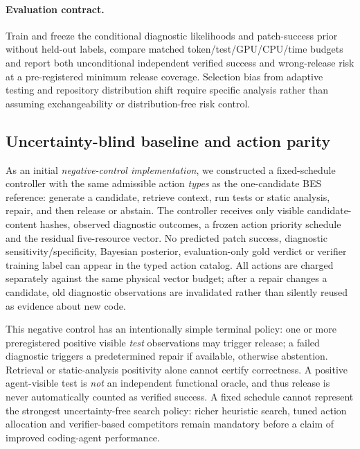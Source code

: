 \documentclass[pdflatex,sn-basic]{sn-jnl}
\begin{document}
\paragraph{Evaluation contract.}
Train and freeze the conditional diagnostic likelihoods and
patch-success prior without held-out labels, compare matched
token/test/GPU/CPU/time budgets and report both unconditional
independent verified success and wrong-release risk at a
pre-registered minimum release coverage. Selection bias from
adaptive testing and repository distribution shift require
specific analysis rather than assuming exchangeability or
distribution-free risk control.

\subsection{Uncertainty-blind baseline and action parity}
\label{sec:blind-control}

As an initial \emph{negative-control implementation},
we constructed a fixed-schedule controller with the
same admissible action \emph{types} as the one-candidate
BES reference: generate a candidate, retrieve context,
run tests or static analysis, repair, and then
release or abstain. The controller receives only
visible candidate-content hashes, observed
diagnostic outcomes, a frozen action priority
schedule and the residual five-resource vector.
No predicted patch success, diagnostic
sensitivity/specificity, Bayesian posterior,
evaluation-only gold verdict or verifier
training label can appear in the typed action
catalog. All actions are charged separately
against the same physical vector budget; after
a repair changes a candidate, old diagnostic
observations are invalidated rather than
silently reused as evidence about new code.

This negative control has an intentionally
simple terminal policy: one or more preregistered
positive visible \emph{test} observations may
trigger release; a failed diagnostic triggers
a predetermined repair if available, otherwise
abstention. Retrieval or static-analysis positivity
alone cannot certify correctness. A positive
agent-visible test is \emph{not} an independent
functional oracle, and thus release is never
automatically counted as verified success.
A fixed schedule cannot represent the strongest
uncertainty-free search policy: richer heuristic
search, tuned action allocation and verifier-based
competitors remain mandatory before a claim
of improved coding-agent performance.
\end{document}
